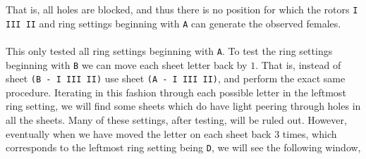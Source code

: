 \noindent That is, all holes are blocked, and thus there is no
position for which the rotors \texttt{I III II} and ring settings
beginning with \texttt{A} can generate the observed females.
\\\\This only tested all ring settings beginning with \texttt{A}. To
test the ring settings beginning with \texttt{B} we can move each
sheet letter back by $1$. That is, instead of sheet \texttt{(B - I
III II)} use sheet \texttt{(A - I III II)}, and perform the exact same
procedure. Iterating in this fashion through each possible letter in
the leftmost ring setting, we will find some sheets which do have
light peering through holes in all the sheets. Many of these
settings, after testing, will be ruled out. However, eventually when
we have moved the letter on each sheet back $3$ times, which
corresponds to the leftmost ring setting being \texttt{D}, we will
see the following window,
